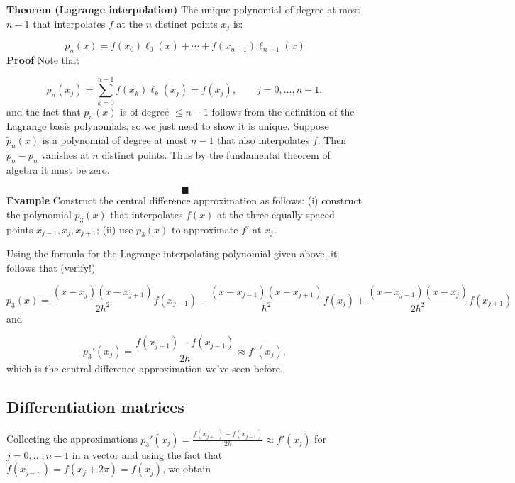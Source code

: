 \documentclass[12pt,a4paper]{article}
\begin{document}
\textbf{Theorem (Lagrange interpolation)} The unique  polynomial of degree at most $n-1$ that interpolates $f$ at the $n$ distinct points $x_j$ is:

\[
p_n(x) = f(x_0) \ensuremath{\ell}_0(x) + \ensuremath{\cdots} + f(x_{n-1}) \ensuremath{\ell}_{n-1}(x)
\]
\textbf{Proof} Note that

\[
p_n(x_j) = \sum_{k=0}^{n-1} f(x_k) \ensuremath{\ell}_k(x_j) = f(x_j), \qquad j = 0, \ldots, n-1,
\]
and the fact that $p_n(x)$ is of degree $\leq n-1$ follows from the definition of the Lagrange basis polynomials, so we just need to show it is unique. Suppose $\tilde{p}_n(x)$ is a  polynomial of degree at most $n-1$ that also interpolates $f$. Then $\tilde{p}_n - p_n$ vanishes at $n$ distinct points. Thus by the fundamental theorem of algebra it must be zero.

\[
\blacksquare
\]
\textbf{Example} Construct the central difference approximation as follows: (i) construct the polynomial $p_3(x)$ that interpolates $f(x)$  at the three equally spaced points $x_{j-1}, x_j, x_{j+1}$; (ii) use $p_3(x)$ to approximate  $f'$ at $x_j$.

Using the formula for the Lagrange interpolating polynomial given above, it follows that (verify!)

\[
p_3(x) = \frac{(x-x_{j})(x-x_{j+1})}{2h^2}f(x_{j-1}) - \frac{(x-x_{j-1})(x-x_{j+1})}{h^2}f(x_{j}) + \frac{(x-x_{j-1})(x-x_{j})}{2h^2}f(x_{j+1})
\]
and

\[
p_3'(x_j) = \frac{f(x_{j+1}) - f(x_{j-1})}{2h}  \approx f'(x_j),
\]
which is the central difference approximation we've seen before.

\subsection{Differentiation matrices}
Collecting the approximations $p_3'(x_j) = \frac{f(x_{j+1}) - f(x_{j-1})}{2h}  \approx f'(x_j)$ for $j = 0, \ldots, n-1$ in a vector and using the fact that $f(x_{j+n}) = f(x_j + 2\pi) = f(x_{j})$, we obtain
\end{document}

